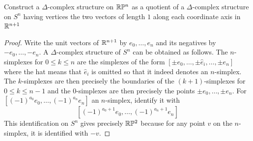 \documentclass[a4paper]{article}
\begin{document}
\begin{ex}{}{} Construct a $\Delta$-complex structure on $\mathbb{R}\mathbb{P}^n$ as a quotient of a $\Delta$-complex structure on $S^n$ having vertices the two vectors of length $1$ along each coordinate axis in $\mathbb{R}^{n+1}$ \tcbline
\begin{proof}
Write the unit vectors of $\mathbb{R}^{n+1}$ by $e_0,\dots,e_n$ and its negatives by $-e_0,\dots,-e_n$. A $\Delta$-complex structure of $S^n$ can be obtained as follows. The $n$-simplexes for $0\leq k\leq n$ are the simplexes of the form $[\pm e_0,\dots,\pm\hat{e}_i,\dots,\pm e_n]$ where the hat means that $\hat{e}_i$ is omitted so that it indeed denotes an $n$-simplex. The $k$-simplexes are then precisely the boundaries of the $(k+1)$-simplexes for $0\leq k\leq n-1$ and the $0$-simplexes are then precisely the points $\pm e_0,\dots,\pm e_n$. For $[(-1)^{a_0}e_0,\dots,(-1)^{a_n}e_n]$ an $n$-simplex, identify it with $$[(-1)^{a_0+1}e_0,\dots,(-1)^{a_n+1}e_n]$$ This identification on $S^n$ gives precisely $\mathbb{R}\mathbb{P}^2$ because for any point $v$ on the $n$-simplex, it is identified with $-v$. 
\end{proof}
\end{ex}
\end{document}
